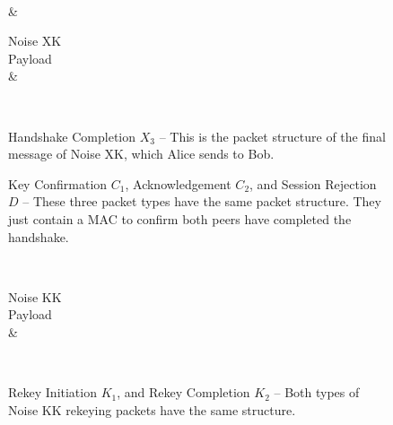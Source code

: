 \documentclass{article}
\begin{document}
\begin{figure}[!ht]
	\caption{Handshake Completion $X_3$ -- This is the packet structure of the final message of Noise XK, which Alice sends to Bob.}\label{packet:handshake_complete}
	\centering
	\begin{bytefield}[bitwidth=6em]{4}
		 \\
		 &  \\
		\begin{rightwordgroup}{Noise XK\\Payload}
			 \\
			 & 
		\end{rightwordgroup} \\
	\end{bytefield}
\end{figure}

\begin{figure}[!ht]
	\caption{Key Confirmation $C_1$, Acknowledgement $C_2$, and Session Rejection $D$ -- These three packet types have the same packet structure. They just contain a MAC to confirm both peers have completed the handshake.}\label{packet:key_conf}
	\centering
	\begin{bytefield}[bitwidth=5em]{4}
	\end{bytefield}
\end{figure}

\begin{figure}[!ht]
	\caption{Rekey Initiation $K_1$, and Rekey Completion $K_2$ -- Both types of Noise KK rekeying packets have the same structure.}\label{packet:rekey}
	\centering
	\begin{bytefield}[bitwidth=5.5em]{4}
		 \\
		\begin{rightwordgroup}{Noise KK\\Payload}
			 \\
			 & 
		\end{rightwordgroup} \\
	\end{bytefield}
\end{figure}
\end{document}
